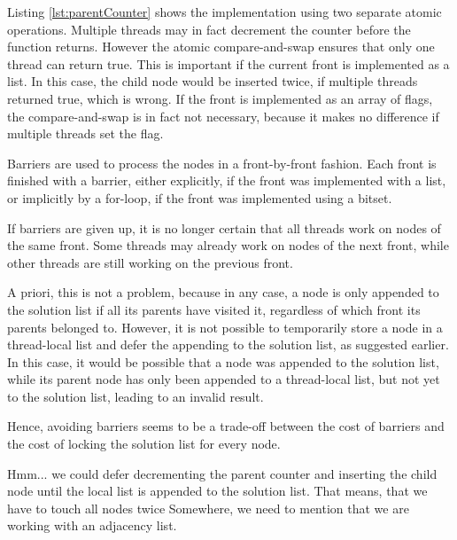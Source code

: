Listing \ref{lst:parentCounter} shows the implementation using two separate atomic operations. Multiple threads may in fact decrement the counter before the function returns.
However the atomic compare-and-swap ensures that only one thread can return true. This is important if the current front is implemented as a list.
In this case, the child node would be inserted twice, if multiple threads returned true, which is wrong.
If the front is implemented as an array of flags, the compare-and-swap is in fact not necessary, because it makes no difference if multiple threads set the flag.

Barriers are used to process the nodes in a front-by-front fashion.
Each front is finished with a barrier, either explicitly, if the front was implemented with a list, or implicitly by a for-loop, if the front was implemented using a bitset.

If barriers are given up, it is no longer certain that all threads work on nodes of the same front.
Some threads may already work on nodes of the next front, while other threads are still working on the previous front.

A priori, this is not a problem, because in any case, a node is only appended to the solution list if all its parents have visited it, regardless of which front its parents belonged to.
However, it is not possible to temporarily store a node in a thread-local list and defer the appending to the solution list, as suggested earlier.
In this case, it would be possible that a node was appended to the solution list, while its parent node has only been appended to a thread-local list, but not yet to the solution list, leading to an invalid result.

Hence, avoiding barriers seems to be a trade-off between the cost of barriers and the cost of locking the solution list for every node.

\begin{invisible}
Hmm... we could defer decrementing the parent counter and inserting the child node until the local list is appended to the solution list. That means, that we have to touch all nodes twice
Somewhere, we need to mention that we are working with an adjacency list.
\end{invisible}
